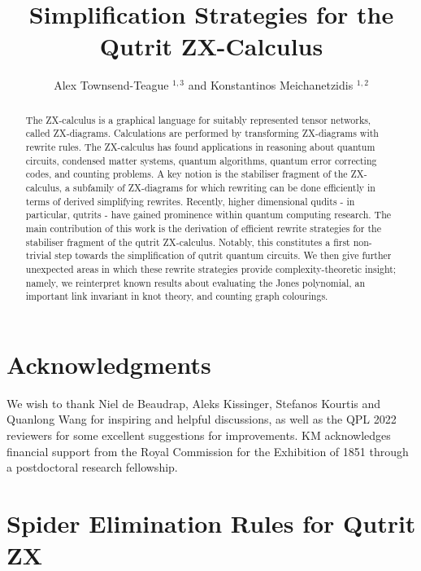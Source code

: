 \documentclass[submission,copyright,creativecommons]{eptcs}
\title{Simplification Strategies for the Qutrit ZX-Calculus}
\author{Alex Townsend-Teague $^{1, 3}$ and Konstantinos Meichanetzidis $^{1,2}$
	\institute{
		$^1$ Department of Computer Science, University of Oxford \\ 
		$^2$ Quantinuum and Cambridge Quantum Computing\\
		$^3$ Dahlem Center for Complex Quantum Systems, Freie Universit\"{a}t Berlin, 14195 Berlin, Germany}
	}
\begin{document}
\maketitle
\begin{abstract}
	The ZX-calculus is a graphical language for suitably represented tensor networks, called ZX-diagrams.
	Calculations are performed by transforming ZX-diagrams with rewrite rules.
	The ZX-calculus has found applications in reasoning about quantum circuits, condensed matter systems, quantum algorithms, quantum error correcting codes, and counting problems.
	A key notion is the stabiliser fragment of the ZX-calculus, a subfamily of ZX-diagrams for which rewriting can be done efficiently in terms of derived simplifying rewrites.
	Recently, higher dimensional qudits - in particular, qutrits - have gained prominence within quantum computing research.
	The main contribution of this work is the derivation of
	efficient rewrite strategies for the stabiliser fragment of the qutrit ZX-calculus.
	Notably, this constitutes a first non-trivial step towards the simplification of qutrit quantum circuits. We then give further unexpected areas in which these rewrite strategies provide complexity-theoretic insight; namely, we reinterpret known results about evaluating the Jones polynomial, an important link invariant in knot theory, and counting graph colourings.
\end{abstract}







\section{Acknowledgments}
We wish to thank Niel de Beaudrap, Aleks Kissinger, Stefanos 
Kourtis and Quanlong Wang for inspiring and helpful discussions, as well as the QPL 2022 reviewers for some excellent suggestions for improvements.
KM acknowledges financial support from the Royal Commission for the Exhibition of 1851 through a postdoctoral research fellowship.


% 


\appendix



\section{Spider Elimination Rules for Qutrit ZX}




\end{document}

